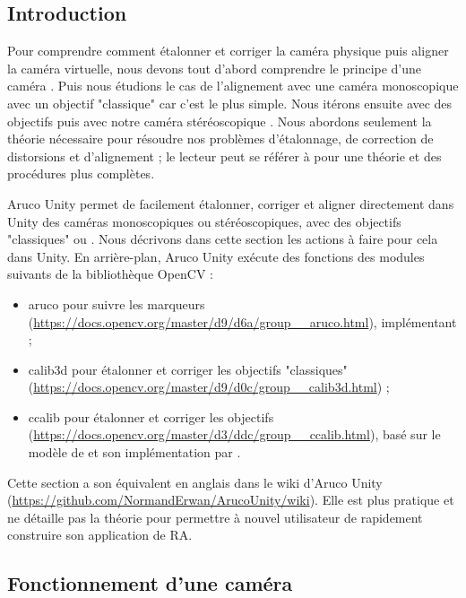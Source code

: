 \subsection{Introduction}
\label{subsec:cameras_alignment_introduction}
Pour comprendre comment étalonner et corriger la caméra physique puis aligner la caméra virtuelle, nous devons tout d'abord comprendre le principe d'une caméra . Puis nous étudions le cas de l'alignement avec une caméra monoscopique avec un objectif "classique"  car c'est le plus simple. Nous itérons ensuite avec des objectifs   puis avec notre caméra stéréoscopique . Nous abordons seulement la théorie nécessaire pour résoudre nos problèmes d'étalonnage, de correction de distorsions et d'alignement ; le lecteur peut se référer à \cite[chap. 18-19]{Kaehler2017} pour une théorie et des procédures plus complètes.

Aruco Unity permet de facilement étalonner, corriger et aligner directement dans Unity des caméras monoscopiques ou stéréoscopiques, avec des objectifs "classiques" ou . Nous décrivons dans cette section les actions à faire pour cela dans Unity. En arrière-plan, Aruco Unity exécute des fonctions des modules suivants de la bibliothèque OpenCV :
\begin{itemize}
 \item aruco pour suivre les marqueurs (\url{https://docs.opencv.org/master/d9/d6a/group__aruco.html}), implémentant \cite{Garrido-Jurado2014} ;
 \item calib3d pour étalonner et corriger les objectifs "classiques" (\url{https://docs.opencv.org/master/d9/d0c/group__calib3d.html}) ;
 \item ccalib pour étalonner et corriger les objectifs  (\url{https://docs.opencv.org/master/d3/ddc/group__ccalib.html}), basé sur le modèle de \cite{Mei2007} et son implémentation par \cite{Li2013}.
\end{itemize}

Cette section a son équivalent en anglais dans le wiki d'Aruco Unity (\url{https://github.com/NormandErwan/ArucoUnity/wiki}). Elle est plus pratique et ne détaille pas la théorie pour permettre à nouvel utilisateur de rapidement construire son application de RA.

\subsection{Fonctionnement d'une caméra}
\label{subsec:camera_theory}

